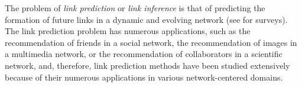 \documentclass[10pt,journal,compsoc]{IEEEtran}
\begin{document}
\IEEEdisplaynontitleabstractindextext



%
\IEEEpeerreviewmaketitle



The problem of {\em link prediction} or {\em link inference} is that
of predicting the formation of future links in a dynamic and
evolving network (see \cite{chancc,linyuan-2011,Hasan-2011} for surveys). The link prediction problem has numerous
applications, such as the recommendation of friends in a social
network, the recommendation of images in a multimedia network, or
the recommendation of collaborators in a scientific network, and, therefore, link
prediction methods have been studied extensively because of their numerous applications in various network-centered domains.
\end{document}
